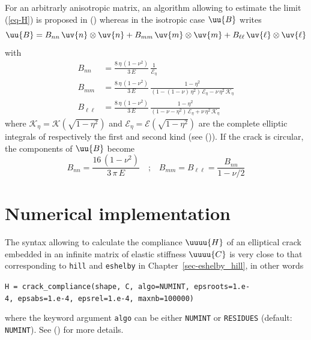 \documentclass[
  letterpaper,
  DIV=11,
  numbers=noendperiod]{scrreprt}
\begin{document}
For an arbitrarly anisotropic matrix, an algorithm allowing to estimate
the limit (\ref{eq-H}) is proposed in
() whereas in the
isotropic case \(\uu{B}\) writes \[
\uu{B}=
B_{nn}\,\uv{n}\otimes\uv{n}
+
B_{mm}\,\uv{m}\otimes\uv{m}
+
B_{\ell\ell}\,\uv{\ell}\otimes\uv{\ell}
\] with \[\begin{aligned}
B_{nn}&=\frac{8\,\eta\,(1-\nu^2)}{3\,E}\,
\frac{1}{\mathcal{E}_\eta}\label{eq:Bnn}\\
B_{mm}&=\frac{8\,\eta\,(1-\nu^2)}{3\,E}\,
\frac{1-\eta^2}{\left(1-(1-\nu)\,\eta^2\right)
\,\mathcal{E}_\eta-\nu\,\eta^2\,\mathcal{K}_\eta}\\
B_{\ell\ell}&=\frac{8\,\eta\,(1-\nu^2)}{3\,E}\,
\frac{1-\eta^2}{(1-\nu-\eta^2)\,\mathcal{E}_\eta+\nu\,\eta^2\,\mathcal{K}_\eta}
\end{aligned}\] where \(\mathcal{K}_\eta=\mathcal{K}(\sqrt{1-\eta^2})\)
and \(\mathcal{E}_\eta=\mathcal{E}(\sqrt{1-\eta^2})\) are the complete
elliptic integrals of respectively the first and second kind (see
()). If the
crack is circular, the components of \(\uu{B}\) become \[
B_{nn}=\frac{16\,(1-\nu^2)}{3\,\pi\,E}
\quad\textrm{;}\quad
B_{mm}=B_{\ell\ell}=\frac{B_{nn}}{1-\nu/2}
\]

\section{Numerical implementation}\label{numerical-implementation}

The syntax allowing to calculate the compliance \(\uuuu{H}\) of an
elliptical crack embedded in an infinite matrix of elastic stiffness
\(\uuuu{C}\) is very close to that corresponding to \texttt{hill} and
\texttt{eshelby} in Chapter~\ref{sec-eshelby_hill}, in other words

\texttt{H\ =\ crack\_compliance(shape,\ C,\ algo=NUMINT,\ epsroots=1.e-4,\ epsabs=1.e-4,\ epsrel=1.e-4,\ maxnb=100000)}

where the keyword argument \texttt{algo} can be either \texttt{NUMINT}
or \texttt{RESIDUES} (default: \texttt{NUMINT}). See
() for more details.
\end{document}
